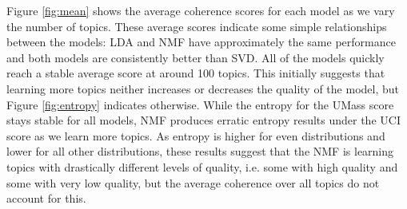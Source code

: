 Figure \ref{fig:mean} shows the average coherence scores for each model as we
vary the number of topics.  These average scores indicate some simple
relationships between the models: LDA and NMF have approximately the same
performance and both models are consistently better than SVD.  All of the models
quickly reach a stable average score at around 100 topics.  This initially
suggests that learning more topics neither increases or decreases the quality of
the model, but Figure \ref{fig:entropy} indicates otherwise.  While the entropy
for the UMass score stays stable for all models, NMF produces erratic entropy
results under the UCI score as we learn more topics.  As entropy is higher for
even distributions and lower for all other distributions, these results suggest
that the NMF is learning topics with drastically different levels of quality,
i.e. some with high quality and some with very low quality, but the average
coherence over all topics do not account for this.


